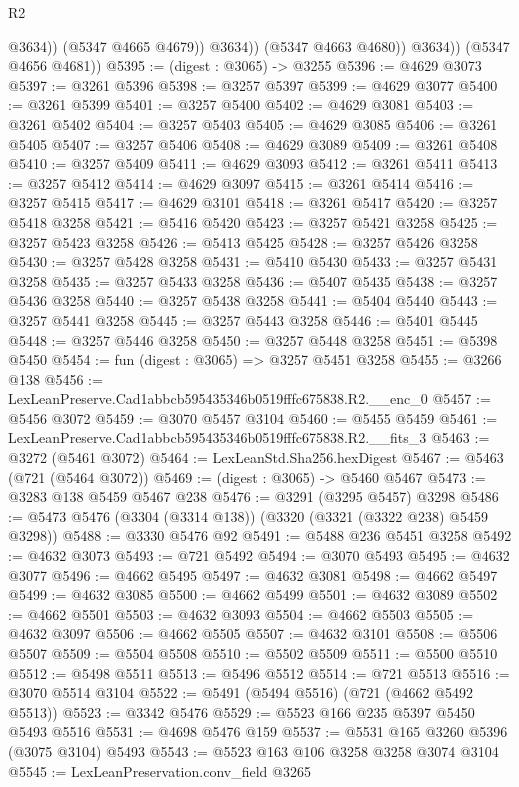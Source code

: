 \begin{lexlean}{R2}
\begin{coremodule}
                      @3634))
                  (@5347 @4665 @4679))
                @3634))
            (@5347 @4663 @4680))
          @3634))
      (@5347 @4656 @4681))
@5395 := (digest : @3065) -> @3255
@5396 := @4629 @3073
@5397 := @3261 @5396
@5398 := @3257 @5397
@5399 := @4629 @3077
@5400 := @3261 @5399
@5401 := @3257 @5400
@5402 := @4629 @3081
@5403 := @3261 @5402
@5404 := @3257 @5403
@5405 := @4629 @3085
@5406 := @3261 @5405
@5407 := @3257 @5406
@5408 := @4629 @3089
@5409 := @3261 @5408
@5410 := @3257 @5409
@5411 := @4629 @3093
@5412 := @3261 @5411
@5413 := @3257 @5412
@5414 := @4629 @3097
@5415 := @3261 @5414
@5416 := @3257 @5415
@5417 := @4629 @3101
@5418 := @3261 @5417
@5420 := @3257 @5418 @3258
@5421 := @5416 @5420
@5423 := @3257 @5421 @3258
@5425 := @3257 @5423 @3258
@5426 := @5413 @5425
@5428 := @3257 @5426 @3258
@5430 := @3257 @5428 @3258
@5431 := @5410 @5430
@5433 := @3257 @5431 @3258
@5435 := @3257 @5433 @3258
@5436 := @5407 @5435
@5438 := @3257 @5436 @3258
@5440 := @3257 @5438 @3258
@5441 := @5404 @5440
@5443 := @3257 @5441 @3258
@5445 := @3257 @5443 @3258
@5446 := @5401 @5445
@5448 := @3257 @5446 @3258
@5450 := @3257 @5448 @3258
@5451 := @5398 @5450
@5454 := fun (digest : @3065) => @3257 @5451 @3258
@5455 := @3266 @138
@5456 := LexLeanPreserve.Cad1abbcb595435346b0519fffc675838.R2.__enc_0
@5457 := @5456 @3072
@5459 := @3070 @5457 @3104
@5460 := @5455 @5459
@5461 := LexLeanPreserve.Cad1abbcb595435346b0519fffc675838.R2.__fits_3
@5463 := @3272 (@5461 @3072)
@5464 := LexLeanStd.Sha256.hexDigest
@5467 := @5463 (@721 (@5464 @3072))
@5469 := (digest : @3065) -> @5460 @5467
@5473 := @3283 @138 @5459 @5467 @238
@5476 := @3291 (@3295 @5457) @3298
@5486 := @5473 @5476 (@3304 (@3314 @138)) (@3320 (@3321 (@3322 @238) @5459 @3298))
@5488 := @3330 @5476 @92
@5491 := @5488 @236 @5451 @3258
@5492 := @4632 @3073
@5493 := @721 @5492
@5494 := @3070 @5493
@5495 := @4632 @3077
@5496 := @4662 @5495
@5497 := @4632 @3081
@5498 := @4662 @5497
@5499 := @4632 @3085
@5500 := @4662 @5499
@5501 := @4632 @3089
@5502 := @4662 @5501
@5503 := @4632 @3093
@5504 := @4662 @5503
@5505 := @4632 @3097
@5506 := @4662 @5505
@5507 := @4632 @3101
@5508 := @5506 @5507
@5509 := @5504 @5508
@5510 := @5502 @5509
@5511 := @5500 @5510
@5512 := @5498 @5511
@5513 := @5496 @5512
@5514 := @721 @5513
@5516 := @3070 @5514 @3104
@5522 := @5491 (@5494 @5516) (@721 (@4662 @5492 @5513))
@5523 := @3342 @5476
@5529 := @5523 @166 @235 @5397 @5450 @5493 @5516
@5531 := @4698 @5476 @159
@5537 := @5531 @165 @3260 @5396 (@3075 @3104) @5493
@5543 := @5523 @163 @106 @3258 @3258 @3074 @3104
@5545 := LexLeanPreservation.conv_field @3265

\end{coremodule}
\end{lexlean}
